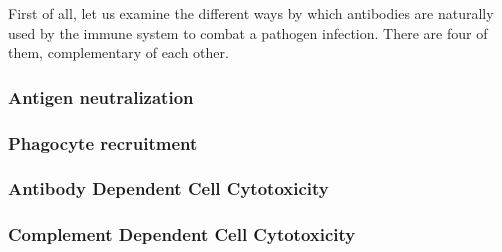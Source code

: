 First of all, let us examine the different ways by which
antibodies are naturally used by the immune system to combat
a pathogen infection. There are four of them, complementary of each other.

\subsubsection{Antigen neutralization}

\subsubsection{Phagocyte recruitment}

\subsubsection{Antibody Dependent Cell Cytotoxicity}

\subsubsection{Complement Dependent Cell Cytotoxicity}
